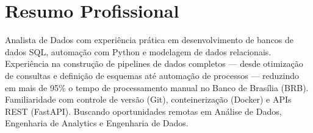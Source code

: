 \justifying
\section{Resumo Profissional}
Analista de Dados com experiência prática em desenvolvimento de bancos de dados SQL, automação com Python e modelagem de dados relacionais. Experiência na construção de pipelines de dados completos --- desde otimização de consultas e definição de esquemas até automação de processos --- reduzindo em mais de 95\% o tempo de processamento manual no Banco de Brasília (BRB). Familiaridade com controle de versão (Git), conteinerização (Docker) e APIs REST (FastAPI). Buscando oportunidades remotas em Análise de Dados, Engenharia de Analytics e Engenharia de Dados.
